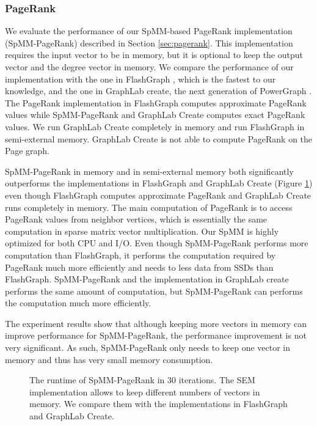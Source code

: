 \subsubsection{PageRank}
We evaluate the performance of our SpMM-based PageRank implementation
(SpMM-PageRank) described
in Section \ref{sec:pagerank}. This implementation requires the input vector
to be in memory, but it is optional to keep the output vector and the degree
vector in memory. We compare the performance of our implementation with
the one in FlashGraph \cite{flashgraph}, which is the fastest to our knowledge,
and the one in GraphLab create, the next generation of
PowerGraph \cite{powergraph}. The PageRank implementation in FlashGraph computes
approximate PageRank values while SpMM-PageRank and GraphLab Create computes
exact PageRank values. We run GraphLab Create completely in memory and run
FlashGraph in semi-external memory. GraphLab Create is not able to compute
PageRank on the Page graph.

SpMM-PageRank in memory and in semi-external memory both significantly outperforms
the implementations in FlashGraph and GraphLab Create (Figure \ref{perf:pagerank})
even though FlashGraph computes approximate PageRank and GraphLab Create runs
completely in memory. The main computation of PageRank is to access PageRank
values from neighbor vertices, which is essentially the same computation in
sparse matrix vector multiplication. Our SpMM is highly optimized for both CPU
and I/O. Even though SpMM-PageRank performs more computation than FlashGraph,
it performs the computation required by PageRank much more efficiently and
needs to less data from SSDs than FlashGraph. SpMM-PageRank and the implementation
in GraphLab create performs the same amount of computation, but SpMM-PageRank
can performs the computation much more efficiently.

The experiment results show that although keeping more vectors in memory can
improve performance for SpMM-PageRank, the performance improvement is not very
significant. As such, SpMM-PageRank only needs to keep one vector in memory
and thus has very small memory consumption.

\begin{figure}
	\begin{center}
		\footnotesize
		
		\caption{The runtime of SpMM-PageRank in 30 iterations. The SEM
			implementation allows to keep different numbers of vectors in memory.
			We compare them with the implementations in FlashGraph and GraphLab
		Create.}
		\label{perf:pagerank}
	\end{center}
\end{figure}


